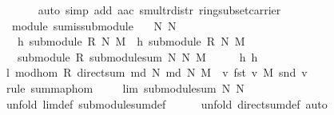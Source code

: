 \begin{isabellebody}
\ \ \ \ \ \isamarkupfalse%
\ {\isacharparenleft}auto\ simp\ add{\isacharcolon}\ a{\isacharunderscore}ac\ smult{\isacharunderscore}r{\isacharunderscore}distr\ ring{\isacharunderscore}subset{\isacharunderscore}carrier{\isacharparenright}\ \isanewline
\ \ \ \ \ \ \isanewline
{}\isamarkupfalse%
%
\endisatagproof
{\isafoldproof}%
%
\isadelimproof
\isanewline
%
\endisadelimproof
\isanewline
{}\isamarkupfalse%
\ {\isacharparenleft}\ module{\isacharparenright}\ sum{\isacharunderscore}is{\isacharunderscore}submodule{\isacharcolon}\isanewline
\ \ \ N{}\ N{}\isanewline
\ \ \ h{}{\isacharcolon}\ {\isachardoublequoteopen}submodule\ R\ N{}\ M{\isachardoublequoteclose}\ \ h{}{\isacharcolon}\ {\isachardoublequoteopen}submodule\ R\ N{}\ M{\isachardoublequoteclose}\isanewline
\ \ \ {\isachardoublequoteopen}submodule\ R\ {\isacharparenleft}submodule{\isacharunderscore}sum\ N{}\ N{}{\isacharparenright}\ M{\isachardoublequoteclose}\isanewline
%
\isadelimproof
%
\endisadelimproof
%
\isatagproof
{}\isamarkupfalse%
\ {\isacharminus}\isanewline
\ \ \isamarkupfalse%
\ h{}\ h{}\ \isamarkupfalse%
\ l{\isacharcolon}\ mod{\isacharunderscore}hom\ R\ {\isachardoublequoteopen}{\isacharparenleft}direct{\isacharunderscore}sum\ {\isacharparenleft}md\ N{}{\isacharparenright}\ {\isacharparenleft}md\ N{}{\isacharparenright}{\isacharparenright}{\isachardoublequoteclose}\ M\ {\isachardoublequoteopen}{\isacharparenleft}{\isasymlambda}\ v{\isachardot}\ {\isacharparenleft}fst\ v{\isacharparenright}\ {\isasymoplus}\isactrlbsub M\isactrlesub \ {\isacharparenleft}snd\ v{\isacharparenright}{\isacharparenright}{\isachardoublequoteclose}\ \isanewline
\ \ \ \ \isamarkupfalse%
\ {\isacharparenleft}rule\ sum{\isacharunderscore}map{\isacharunderscore}hom{\isacharparenright}\isanewline
\ \ \isamarkupfalse%
\ {}{\isacharcolon}\ {\isachardoublequoteopen}l{\isachardot}im\ {\isacharequal}submodule{\isacharunderscore}sum\ N{}\ N{}{\isachardoublequoteclose}\isanewline
\ \ \ \ \isamarkupfalse%
\ {\isacharparenleft}unfold\ l{\isachardot}im{\isacharunderscore}def\ submodule{\isacharunderscore}sum{\isacharunderscore}def{\isacharparenright}\isanewline
\ \ \ \ \isamarkupfalse%
\ {\isacharparenleft}unfold\ direct{\isacharunderscore}sum{\isacharunderscore}def{\isacharcomma}\ auto{\isacharparenright}\isanewline

\end{isabellebody}
